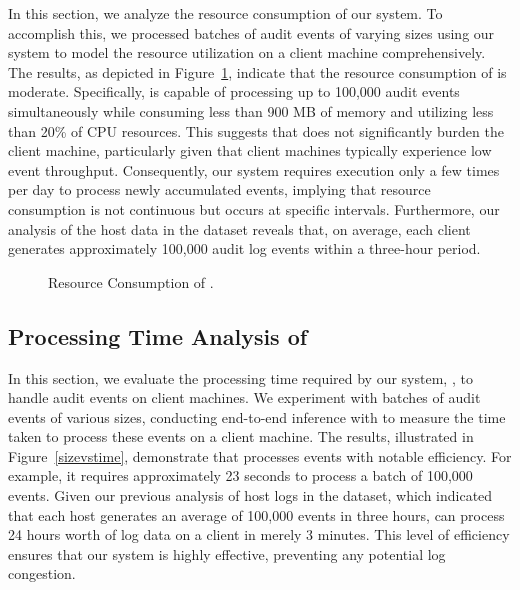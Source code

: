  In this section, we analyze the resource consumption of our system. To accomplish this, we processed batches of audit events of varying sizes using our system to model the resource utilization on a client machine comprehensively. The results, as depicted in Figure~\ref{fig:resource}, indicate that the resource consumption of \Sys is moderate. Specifically, \Sys is capable of processing up to 100,000 audit events simultaneously while consuming less than 900 MB of memory and utilizing less than 20\% of CPU resources. This suggests that \Sys does not significantly burden the client machine, particularly given that client machines typically experience low event throughput. Consequently, our system requires execution only a few times per day to process newly accumulated events, implying that resource consumption is not continuous but occurs at specific intervals. Furthermore, our analysis of the host data in the \optc dataset reveals that, on average, each client generates approximately 100,000 audit log events within a three-hour period.

 \begin{figure}[t!]
  \centering
  \hfill
  \hfill
  \caption{Resource Consumption of \Sys.}
  \label{fig:resource}
  \vspace{-2ex}
\end{figure}

 \subsection{Processing Time Analysis of \Sys}

 In this section, we evaluate the processing time required by our system, \Sys, to handle audit events on client machines. We experiment with batches of audit events of various sizes, conducting end-to-end inference with \Sys to measure the time taken to process these events on a client machine. The results, illustrated in Figure~\ref{sizevstime}, demonstrate that \Sys processes events with notable efficiency. For example, it requires approximately 23 seconds to process a batch of 100,000 events. Given our previous analysis of host logs in the \optc dataset, which indicated that each host generates an average of 100,000 events in three hours, \Sys can process 24 hours worth of log data on a client in merely 3 minutes. This level of efficiency ensures that our system is highly effective, preventing any potential log congestion.

